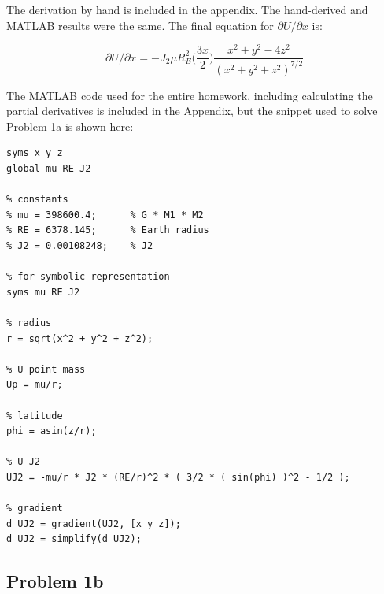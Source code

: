 \documentclass[conf]{new-aiaa}
\begin{document}

The derivation by hand is included in the appendix. The hand-derived and MATLAB results were the same. The final equation for $\partial U / \partial x $ is: 

\begin{equation}
	\partial U / \partial x = -J_2 \mu R_E^2 \Big( \dfrac{3x}{2} \Big) \dfrac{ x^2 + y^2 - 4z^2 }{ (x^2 + y^2 + z^2)^{7/2} }
\end{equation}

The MATLAB code used for the entire homework, including calculating the partial derivatives is included in the Appendix, but the snippet used to solve Problem 1a is shown here: 

\begin{lstlisting}
syms x y z 
global mu RE J2 

% constants 
% mu = 398600.4;      % G * M1 * M2 
% RE = 6378.145;      % Earth radius 
% J2 = 0.00108248;    % J2 

% for symbolic representation 
syms mu RE J2 

% radius 
r = sqrt(x^2 + y^2 + z^2); 

% U point mass 
Up = mu/r; 

% latitude 
phi = asin(z/r); 

% U J2 
UJ2 = -mu/r * J2 * (RE/r)^2 * ( 3/2 * ( sin(phi) )^2 - 1/2 ); 

% gradient 
d_UJ2 = gradient(UJ2, [x y z]); 
d_UJ2 = simplify(d_UJ2); 
\end{lstlisting}

\newpage

\subsection*{Problem 1b} 

\begin{center}
	 \\
\end{center}
\end{document}
